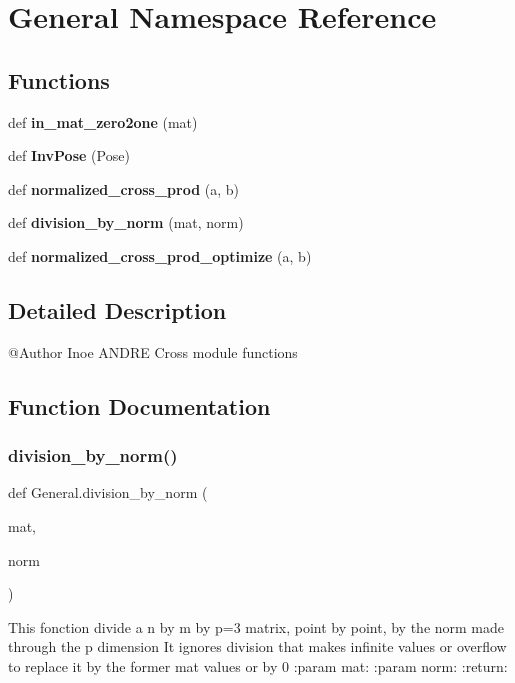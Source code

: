 \section{General Namespace Reference}
\label{namespace_general}
\subsection*{Functions}
\begin{DoxyCompactItemize}
\item 
def \textbf{ in\+\_\+mat\+\_\+zero2one} (mat)
\item 
def \textbf{ Inv\+Pose} (Pose)
\item 
def \textbf{ normalized\+\_\+cross\+\_\+prod} (a, b)
\item 
def \textbf{ division\+\_\+by\+\_\+norm} (mat, norm)
\item 
def \textbf{ normalized\+\_\+cross\+\_\+prod\+\_\+optimize} (a, b)
\end{DoxyCompactItemize}


\subsection{Detailed Description}
\begin{DoxyVerb}@Author Inoe ANDRE
Cross module functions
\end{DoxyVerb}
 

\subsection{Function Documentation}
\mbox{\label{namespace_general_acbd88c2bfc6296ec9d5714f5fa7116f8}} 
\subsubsection{division\+\_\+by\+\_\+norm()}
{\footnotesize\ttfamily def General.\+division\+\_\+by\+\_\+norm (\begin{DoxyParamCaption}\item[{}]{mat,  }\item[{}]{norm }\end{DoxyParamCaption})}

\begin{DoxyVerb}This fonction divide a n by m by p=3 matrix, point by point, by the norm made through the p dimension
It ignores division that makes infinite values or overflow to replace it by the former mat values or by 0
:param mat:
:param norm:
:return:
\end{DoxyVerb}
 \mbox{\label{namespace_general_a9fafbff15974c6b9a6032e6f5b568808}} 

